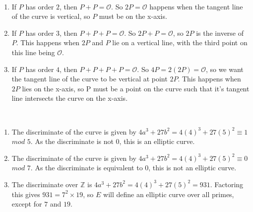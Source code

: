 \documentclass{assignment}
\begin{document}
\begin{problemlist}
\pbitem
\begin{problem}
\end{problem}
\begin{answer}
  \\  
  \begin{enumerate}
  \item
    If $P$ has order $2$, then $P+P=\mathcal{O}$. So $2P=\mathcal{O}$ happens when the tangent line of the curve is vertical, so $P$ must be on the x-axis.
  \item
    If $P$ has order $3$, then $P+P+P=\mathcal{O}$. So $2P + P = \mathcal{O}$, so $2P$ is the inverse of $P$. This happens when $2P$ and $P$ lie on a vertical line, with the third point on this line being $\mathcal{O}$.
  \item
    If $P$ has order $4$, then $P+P+P+P=\mathcal{O}$. So $4P = 2(2P)=\mathcal{O}$, so we want the tangent line of the curve to be vertical at point $2P$. This happens when $2P$ lies on the x-axis, so P must be a point on the curve such that it's tangent line intersects the curve on the x-axis.
  \end{enumerate}
\end{answer}

\pbitem
\begin{problem}
\end{problem}
\begin{answer}
  \\
  \begin{enumerate}
  \item
    The discriminate of the curve is given by $4a^3 + 27b^2 = 4(4)^3 + 27(5)^2 \equiv 1$ $mod$ $5$. As the discriminate is not $0$, this is an elliptic curve.
  \item
    The discriminate of the curve is given by $4a^3 + 27b^2 = 4(4)^3 + 27(5)^2 \equiv 0$ $mod$ $7$. As the discriminate is equivalent to $0$, this is not an elliptic curve.
  \item
    The discriminate over $\mathbb{Z}$ is $4a^3 + 27b^2 = 4(4)^3 + 27(5)^2 =931$. Factoring this gives $931=7^2\times 19$, so $E$ will define an elliptic curve over all primes, except for $7$ and $19$.
  \end{enumerate}
\end{answer}


\end{problemlist}
\end{document}
